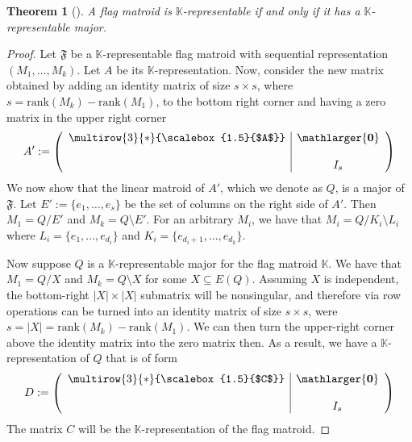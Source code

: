 \documentclass[12pt]{article}
\newtheorem{theorem}[thm]{Theorem}
\theoremstyle{definition}
\begin{document}
\begin{theorem}[{\cite[Theorem 2.23 and Remark 2.24]{jarra2024flag}}]\label{thm: representable iff has representable major}
    A flag matroid is $\mathbb{K}$-representable if and only if it has a $\mathbb{K}$-representable major.
\end{theorem}
\begin{proof}
    Let $\mathfrak{F}$ be a $\mathbb{K}$-representable flag matroid with sequential representation $(M_1, \dots, M_k)$. Let $A$ be its $\mathbb{K}$-representation.
    Now, consider the new matrix obtained by adding an identity matrix of size $s\times s$, where $s = \text{rank}(M_k)-\text{rank}(M_1)$, to the bottom right corner and having a zero matrix in the upper right corner
    \begin{equation*}
        A' := \begin{pmatrix}
            \begin{array}{c|c}
                \multirow{3}{*}{\scalebox{1.5}{$A$}} & \mathlarger{\textbf{0}} \\
                 & \\
                & \textbf{$I_s$}
            \end{array}
        \end{pmatrix}
    \end{equation*}
    We now show that the linear matroid of $A'$, which we denote as $Q$, is a major of $\mathfrak{F}$.
    Let $E' := \{e_1, \dots, e_s\}$ be the set of columns on the right side of $A'$.
    Then $M_1=Q/E'$ and $M_k = Q\setminus E'$.
    For an arbitrary $M_i$, we have that $M_i = Q/K_i\setminus L_i$
    where $L_i = \{e_1,\dots,e_{d_i}\}$ and $K_i = \{e_{d_i+1},\dots,e_{d_k}\}$.

    Now suppose $Q$ is a $\mathbb{K}$-representable major for the flag matroid $\mathbb{K}$. We have that $M_1 = Q/X$ and $M_k = Q\setminus X$ for some $X \subseteq E(Q)$. Assuming $X$ is independent, the bottom-right $|X| \times |X|$ submatrix will be nonsingular, and therefore via row operations can be turned into an identity matrix of size $s \times s$, were $s = |X| = \text{rank}(M_k) - \text{rank}(M_1)$. We can then turn the upper-right corner above the identity matrix into the zero matrix then. As a result, we have a $\mathbb{K}$-representation of $Q$ that is of form
    \begin{equation*}
        D := \begin{pmatrix}
            \begin{array}{c|c}
                \multirow{3}{*}{\scalebox{1.5}{$C$}} & \mathlarger{\textbf{0}} \\
                 & \\
                & \textbf{$I_s$}
            \end{array}
        \end{pmatrix}
    \end{equation*}
    The matrix $C$ will be the $\mathbb{K}$-representation of the flag matroid. 
\end{proof}
\end{document}
